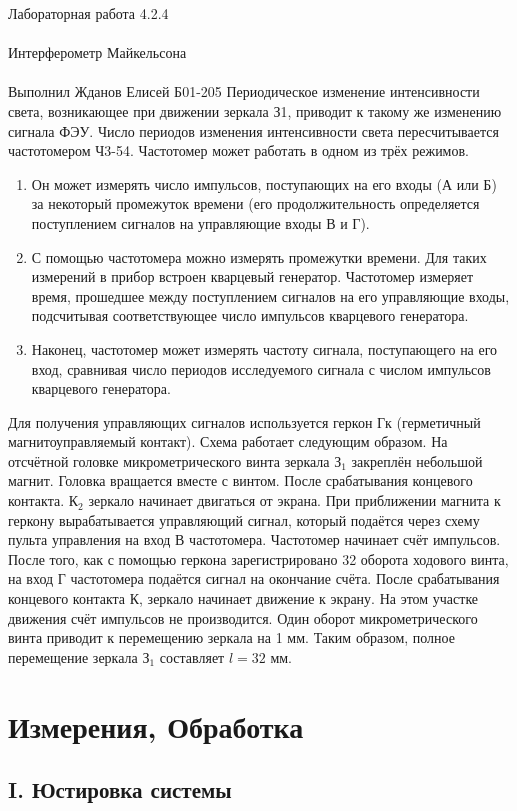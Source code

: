 \documentclass{astroedu-lab}
\begin{document}
\begin{problem}{\huge Лабораторная работа 4.2.4\\\\Интерферометр Майкельсона\\\\Выполнил Жданов Елисей Б01-205}
	 Периодическое изменение интенсивности света, возникающее при движении зеркала З1, приводит к такому же изменению сигнала ФЭУ. Число периодов изменения интенсивности света пересчитывается частотомером Ч3-54. Частотомер может работать в одном из трёх режимов.
	 \begin{enumerate}
	 	\item Он может измерять число импульсов, поступающих на его входы (А или Б) за некоторый промежуток времени (его продолжительность определяется поступлением сигналов на управляющие входы В и Г).
	 	\item С помощью частотомера можно измерять промежутки времени. Для таких измерений в прибор встроен кварцевый генератор. Частотомер измеряет время, прошедшее между поступлением сигналов на его управляющие входы, подсчитывая соответствующее число импульсов кварцевого генератора.
	 	\item Наконец, частотомер может измерять частоту сигнала, поступающего на его вход, сравнивая число периодов исследуемого сигнала с числом импульсов кварцевого генератора. 
	 	
 	\end{enumerate}
	 	
	 	Для получения управляющих сигналов используется геркон Гк (герметичный магнитоуправляемый контакт). Схема работает следующим образом. На отсчётной головке микрометрического винта зеркала З$_1$ закреплён небольшой магнит. Головка вращается вместе с винтом. После срабатывания концевого контакта. К$_2$ зеркало начинает двигаться от экрана. При приближении магнита к геркону вырабатывается управляющий сигнал, который подаётся через схему пульта управления на вход В частотомера. Частотомер начинает счёт импульсов. После того, как с помощью геркона зарегистрировано 32 оборота ходового винта, на вход Г частотомера подаётся сигнал на окончание счёта. После срабатывания концевого контакта К, зеркало начинает движение к экрану. На этом участке движения счёт импульсов не производится. Один оборот микрометрического винта приводит к перемещению зеркала на 1 мм. Таким образом, полное перемещение зеркала З$_1$ составляет $l = 32$ мм.

\section{Измерения, Обработка}

\subsection{I. Юстировка системы}


\end{problem}
\end{document}
